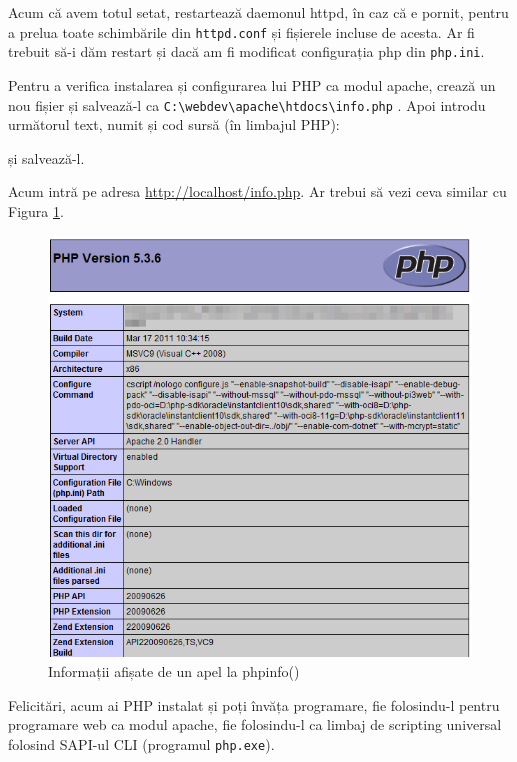 
Acum că avem totul setat, restartează daemonul httpd, în caz că e pornit, pentru a prelua
toate schimbările din \texttt{httpd.conf} și fișierele incluse de acesta. Ar fi trebuit să-i
dăm restart și dacă am fi modificat configurația php din \texttt{php.ini}.

Pentru a verifica instalarea și configurarea lui PHP ca modul apache, crează un nou fișier
și salvează-l ca 
\texttt{C:{\textbackslash}webdev{\textbackslash}apache{\textbackslash}htdocs{\textbackslash}info.php}
. Apoi introdu următorul text, numit și cod sursă (în limbajul PHP):

și salvează-l. 

Acum intră pe adresa \url{http://localhost/info.php}. Ar trebui să vezi ceva similar cu Figura \ref{img:php phpinfo}.

\begin{figure}[ht!]
  \centering
    \includegraphics[width=300bp]{cap01/Screenshot-15.png}
  \caption{Informații afișate de un apel la phpinfo()}
  \label{img:php phpinfo}
\end{figure}

Felicitări, acum ai PHP instalat și poți învăța programare, fie folosindu-l pentru programare web
ca modul apache, fie folosindu-l ca limbaj de scripting universal folosind SAPI-ul CLI (programul \texttt{php.exe}).

